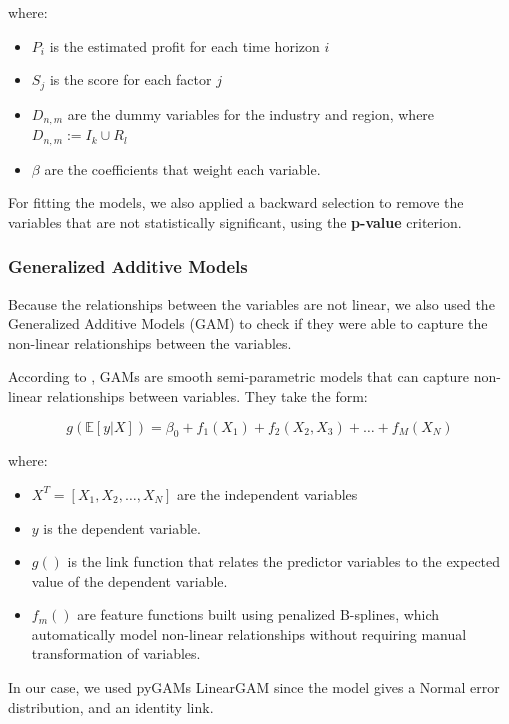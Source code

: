 \documentclass[11pt,english,a4paper,hidelinks]{book}
\begin{document}
\noindent where:
\begin{itemize}
    \item \(P_i\) is the estimated profit for each time horizon \(i\)
    \item \(S_j\) is the score for each factor \(j\)
    \item \(D_{n,m}\) are the dummy variables for the industry and region, where \(D_{n,m} := I_k \cup R_l\)
    \item \(\beta\) are the coefficients that weight each variable.
\end{itemize}

\noindent For fitting the models, we also applied a backward selection to remove the variables that are not statistically significant, using the \textbf{p-value} criterion.

\subsubsection{Generalized Additive Models}

Because the relationships between the variables are not linear, we also used the Generalized Additive Models (GAM) to check if they were able to capture the non-linear relationships between the variables.

\vspace{0.5cm}
\noindent According to \textcite{pygam2018}, GAMs are smooth semi-parametric models that can capture non-linear relationships between variables. They take the form:

\begin{equation}
    g(\mathbb{E}[y|X]) = \beta_0 + f_1(X_1) + f_2(X_2,X_3) + \dots + f_M(X_N)
\end{equation}

\noindent where:
\begin{itemize}
    \item \(X^T = [X_1, X_2, \dots, X_N]\) are the independent variables
    \item \(y\) is the dependent variable.
    \item \(g()\) is the link function that relates the predictor variables to the expected value of the dependent variable.
    \item \(f_m()\) are feature functions built using penalized B-splines, which automatically model non-linear relationships without requiring manual transformation of variables.
\end{itemize}

\noindent In our case, we used pyGAMs LinearGAM since the model gives a Normal error distribution, and an identity link.
\end{document}
